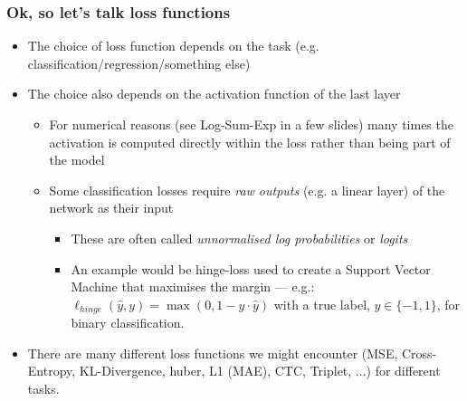 \documentclass[\beamerclass]{beamer}
\begin{document}
\begin{frame}[fragile]\frametitle{Ok, so let's talk loss functions}

\begin{itemize}
  \item<+-> The choice of loss function depends on the task (e.g. classification/regression/something else)
  \item<+-> The choice also depends on the activation function of the last layer
  \begin{itemize}
    \item<+-> For numerical reasons (see Log-Sum-Exp in a few slides) many times the activation is computed directly within the loss rather than being part of the model
    \item<+-> Some classification losses require \emph{raw outputs} (e.g. a linear layer) of the network as their input 
    \begin{itemize}
      \item These are often called \emph{unnormalised log probabilities} or \emph{logits}
      \item An example would be hinge-loss used to create a Support Vector Machine that maximises the margin --- e.g.: $\ell_{hinge}(\hat y, y) = \max(0, 1-y \cdot \hat y)$ with a true label, $y \in \{-1,1\}$, for binary classification.
    \end{itemize}
  \end{itemize}
  \item<+-> There are many different loss functions we might encounter (MSE, Cross-Entropy, KL-Divergence, huber, L1 (MAE), CTC, Triplet, ...) for different tasks.
\end{itemize}

\end{frame}

\end{document}
